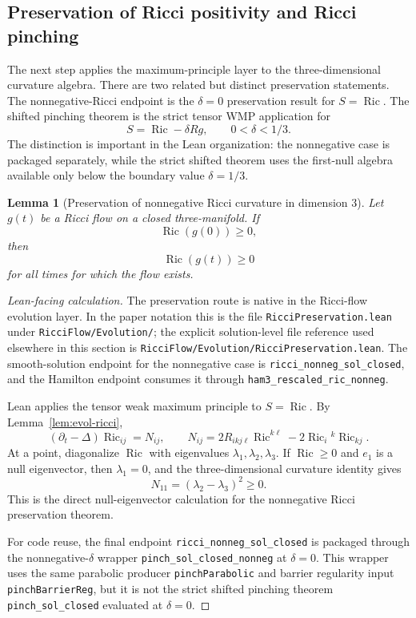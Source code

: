 \documentclass[11pt]{article}
\theoremstyle{plain}
\newtheorem{lemma}[theorem]{Lemma}
\theoremstyle{definition}
\theoremstyle{remark}
\newcommand{\Ric}{\operatorname{Ric}}
\newcommand{\leanref}[1]{\nolinkurl{#1}}
\newcommand{\leanfile}[1]{\nolinkurl{#1}}
\newcommand{\rffile}[1]{\leanfile{#1}}
\newcommand{\rfdir}[1]{\leanfile{#1/}}
\begin{document}
\subsection{Preservation of Ricci positivity and Ricci pinching}

The next step applies the maximum-principle layer to the three-dimensional
curvature algebra.  There are two related but distinct preservation statements.
The nonnegative-Ricci endpoint is the \(\delta=0\) preservation result for
\(S=\Ric\).  The shifted pinching theorem is the strict tensor WMP application
for
\[
  S=\Ric-\delta Rg,\qquad 0<\delta<1/3.
\]
The distinction is important in the Lean organization: the nonnegative case is
packaged separately, while the strict shifted theorem uses the first-null
algebra available only below the boundary value \(\delta=1/3\).

\begin{lemma}[Preservation of nonnegative Ricci curvature in dimension $3$]
\label{lem:preserve-ricci-nonnegative}
Let $g(t)$ be a Ricci flow on a closed three-manifold. If
\[
\Ric(g(0))\ge0,
\]
then
\[
\Ric(g(t))\ge0
\]
for all times for which the flow exists.
\end{lemma}

\begin{proof}[Lean-facing calculation]
The preservation route is native in the Ricci-flow evolution layer.  In the
paper notation this is the file \rffile{RicciPreservation.lean} under
\rfdir{RicciFlow/Evolution}; the explicit solution-level file reference used
elsewhere in this section is \rffile{RicciFlow/Evolution/RicciPreservation.lean}.
The smooth-solution endpoint for the nonnegative case is
\leanref{ricci_nonneg_sol_closed}, and the Hamilton endpoint consumes it through
\leanref{ham3_rescaled_ric_nonneg}.

Lean applies the tensor weak maximum principle to \(S=\Ric\).  By
Lemma~\ref{lem:evol-ricci},
\[
(\partial_t-\Delta)\Ric_{ij}=N_{ij},
\qquad
N_{ij}=2R_{ikj\ell}\Ric^{k\ell}-2\Ric_i{}^k\Ric_{kj}.
\]
At a point, diagonalize \(\Ric\) with eigenvalues
\(\lambda_1,\lambda_2,\lambda_3\).  If \(\Ric\ge0\) and \(e_1\) is a null
eigenvector, then \(\lambda_1=0\), and the three-dimensional curvature
identity gives
\[
N_{11}=(\lambda_2-\lambda_3)^2\ge0.
\]
This is the direct null-eigenvector calculation for the nonnegative Ricci
preservation theorem.

For code reuse, the final endpoint \leanref{ricci_nonneg_sol_closed} is
packaged through the nonnegative-\(\delta\) wrapper
\leanref{pinch_sol_closed_nonneg} at \(\delta=0\).  This wrapper uses the same
parabolic producer \leanref{pinchParabolic} and barrier regularity input
\leanref{pinchBarrierReg}, but it is not the strict shifted pinching theorem
\leanref{pinch_sol_closed} evaluated at \(\delta=0\).
\end{proof}
\end{document}
